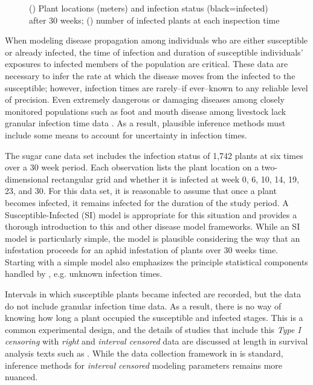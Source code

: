 \documentclass{uwstat572}
\begin{document}
\begin{figure}[h]
\begin{subfigure}[b]{0.49\textwidth}
		\caption{}
		\label{fig:cum_infection}
	\end{subfigure}
	\caption{() Plant locations (meters) and infection status (black=infected) after 30 weeks; () number of infected plants at each inspection time}
	\label{fig:data_plot}
\end{figure} 

When modeling disease propagation among individuals who are either susceptible or already infected, the time of infection and duration of susceptible individuals' exposures to infected members of the population are critical. 
These data are necessary to infer the rate at which the disease moves from the infected to the susceptible; however, infection times are rarely--if ever--known to any reliable level of precision. 
Even extremely dangerous or damaging diseases among closely monitored populations such as foot and mouth disease among livestock lack granular infection time data \citep{Diggle, Deardon}. 
As a result, plausible inference methods must include some means to account for uncertainty in infection times. 

The sugar cane data set includes the infection status of 1,742 plants at six times over a 30 week period. 
Each observation lists the plant location on a two-dimensional rectangular grid and whether it is infected at week 0, 6, 10, 14, 19, 23, and 30.
For this data set, it is reasonable to assume that once a plant becomes infected, it remains infected for the duration of the study period. 
A Susceptible-Infected (SI) model is appropriate for this situation and \citet{Jewell} provides a thorough introduction to this and other disease model frameworks. 
While an SI model is particularly simple, the model is plausible considering the way that an infestation proceeds for an aphid infestation of plants over 30 weeks time. 
Starting with a simple model also emphasizes the principle statistical components handled by \citet{Brown}, e.g. unknown infection times. 

Intervals in which susceptible plants became infected are recorded, but the data do not include granular infection time data.  
As a result, there is no way of knowing how long a plant occupied the susceptible and infected stages.
This is a common experimental design, and the details of studies that include this \textit{Type I censoring} with \textit{right} and \textit{interval censored} data are discussed at length in survival analysis texts such as \citet{Klein}. 
While the data collection framework in \citet{Brown} is standard, inference methods for \textit{interval censored} modeling parameters remains more nuanced.
\end{document}
